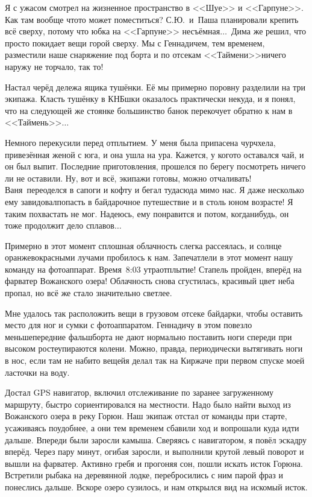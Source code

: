Я с ужасом смотрел на жизненное пространство в <<Шуе>> и <<Гарпуне>>. Как там вообще что\sdash то может поместиться? С.Ю.~и~Паша планировали крепить всё сверху, потому что юбка на <<Гарпуне>> несъёмная$\ldots$~Дима же решил, что просто покидает вещи горой сверху. Мы с Геннадичем, тем временем, разместили наше снаряжение под борта и по отсекам <<Таймени>>\mdash ничего наружу не торчало, так то! 

Настал черёд дележа ящика тушёнки. Её мы примерно поровну разделили на три экипажа. Класть тушёнку в КНБ\sdash шки оказалось практически некуда, и я понял, что на следующей же стоянке большинство банок перекочует обратно к  нам в <<Таймень>>$\ldots$

Немного перекусили перед отплытием. У меня была припасена чурчхела, привезённая женой с юга, и она ушла на ура. Кажется, у кого\sdash то оставался чай, и он был выпит. Последние приготовления, прошелся по берегу посмотреть ничего ли не оставили. Ну, вот и всё, экипажи готовы, можно отчаливать! Ваня~переоделся в сапоги и кофту и бегал туда\sdash сюда мимо нас. Я даже несколько ему завидовал\mdash попасть в байдарочное путешествие и в столь юном возрасте! Я таким похвастать не мог. Надеюсь, ему понравится и потом, когда\sdash нибудь, он тоже продолжит дело сплавов$\ldots$

Примерно в этот момент сплошная облачность слегка рассеялась, и солнце оранжево\sdash красными лучами пробилось к нам. Запечатлели в этот момент нашу команду на фотоаппарат. Время~8:03 утра\mdash отплытие! Стапель пройден, вперёд на фарватер Вожанского  озера! Облачность снова сгустилась, красивый цвет неба пропал, но всё же стало значительно светлее.

Мне удалось так расположить вещи в грузовом отсеке байдарки, чтобы оставить место для ног и сумки с фотоаппаратом. Геннадичу в этом повезло меньше\mdash передние фальшборта не дают нормально поставить ноги спереди при высоком росте\mdash упираются колени. Можно, правда, периодически вытягивать ноги в нос, если там не набито вещей\mdash я делал так на Киржаче при первом спуске моей ласточки на воду.  

Достал GPS навигатор, включил отслеживание по заранее загруженному маршруту, быстро сориентировался на местности. Надо было найти выход из Вожанского озера в реку Горюн. Наш экипаж отстал от команды при старте, усаживаясь поудобнее, а они тем временем сбавили ход и вопрошали куда идти дальше. Впереди были заросли камыша. Сверяясь с навигатором, я повёл эскадру вперёд. Через пару минут, огибая заросли, и выполнили крутой левый поворот и вышли на фарватер. Активно гребя и прогоняя сон, пошли искать исток Горюна. Встретили рыбака на деревянной лодке, перебросились с ним парой фраз и понеслись дальше. Вскоре озеро сузилось, и нам открылся вид на искомый исток.

